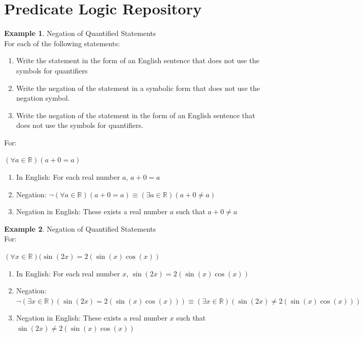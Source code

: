\documentclass{book}
\theoremstyle{definition}
\newtheorem{example}{Example}[definition]
\theoremstyle{remark}
\newcommand{\bb}[1]{\mathbb{#1}}
\begin{document}
\newpage
\section{Predicate Logic Repository} 


\begin{example}
Negation of Quantified Statements \cite[Chap.2, P.C.2.18, Q.1]{ted} \\

For each of the following statements: \\
\begin{enumerate}
    \item Write the statement in the form of an English sentence that does not use the symbols for quantifiers
    \item Write the negation of the statement in a symbolic form that does not use the negation symbol.
    \item Write the negation of the statement in the form of an English sentence that does not use the symbols for quantifiers.    
\end{enumerate}

For: \\
\begin{center}
    $(\forall a \in \bb{R})(a+0=a)$
\end{center}

\begin{enumerate}
    \item In English: For each real number $a$, $a + 0 = a$
    \item Negation: $\neg (\forall a \in \bb{R})(a+0=a) \equiv (\exists a \in \bb{R})(a+0 \neq a)$
    \item Negation in English: These exists a real number $a$ such that $a+0 \neq a$  
\end{enumerate}
\end{example}



\begin{example}
Negation of Quantified Statements \cite[Chap.2, P.C.2.18, Q.2]{ted} \\

For: 
\begin{center}
    $(\forall x \in \bb{R})(\sin(2x) = 2(\sin(x)\cos(x))$
\end{center}

\begin{enumerate}
    \item In English: For each real number $x$, $\sin(2x) = 2(\sin(x)\cos(x))$
    \item Negation: $\neg (\exists x \in \bb{R})(\sin(2x) = 2(\sin(x)\cos(x))) \equiv (\exists x \in \bb{R})(\sin(2x) \neq 2(\sin(x)\cos(x)))$
    \item Negation in English: These exists a real number $x$ such that $\sin(2x) \neq 2(\sin(x)\cos(x))$    
\end{enumerate}
\end{example}
\end{document}
